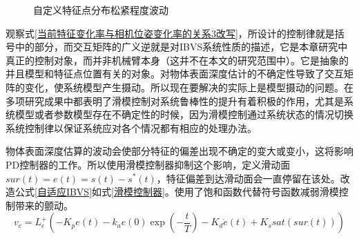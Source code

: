\documentclass[fontset=fandol,type=bachelor,campus=harbin,bsmainpagenumberline=true]{hithesisbook}
\begin{document}
\begin{figure}[h]
{\begin{minipage}[h]{0.4\textwidth}
		\end{minipage}
		\label{自定义特征点分布（波动）}
	}
	\caption{自定义特征点分布松紧程度波动}
	\label{自定义特征点分布松紧程度波动}
\end{figure}


观察式\ref{当前特征变化率与相机位姿变化率的关系3改写}，所设计的控制律就是括号中的部分，而交互矩阵的广义逆就是对IBVS系统性质的描述，它是本章研究中真正的控制对象，而并非机械臂本身（这并不在本文的研究范围中）。它是抽象的并且模型和特征点位置有关的对象。对物体表面深度估计的不确定性导致了交互矩阵的变化，使系统模型产生摄动。所以现在要解决的实际上是模型摄动的问题。在多项研究成果中都表明了滑模控制对系统鲁棒性的提升有着积极的作用\cite{yuksel2015ibvs,parsapour2013position}，尤其是系统模型或者参数模型存在不确定性的时候，因为滑模控制通过系统状态的情况切换系统控制律以保证系统应对各个情况都有相应的处理办法。


物体表面深度估算的波动会使部分特征的偏差出现不确定的变大或变小，这将影响PD控制器的工作。所以使用滑模控制器\cite{li2018enhanced}抑制这个影响，定义滑动面$sur\left( t \right) =e\left( t \right) =s\left( t \right) -s^*\left( t \right) $，特征偏差到达滑动面会一直停留在该处。改造公式\ref{自适应IBVS}如式\ref{滑模控制器}。使用了饱和函数代替符号函数减弱滑模控制带来的颤动。
\begin{equation}
v_c=L_{e}^{+}\left( -K_pe\left( t \right) -k_ae\left( 0 \right) \exp \left( -\frac{t}{T} \right) -K_d\dot{e}\left( t \right) +K_ssat\left( sur\left( t \right) \right) \right) 
\label{滑模控制器}
\end{equation}
\end{document}
